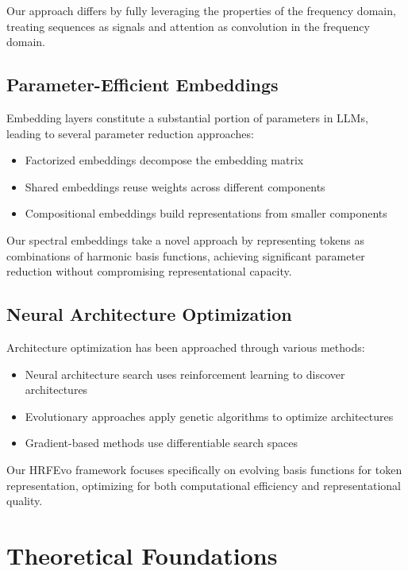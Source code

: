 \documentclass[10pt,twocolumn,letterpaper]{article}
\begin{document}
Our approach differs by fully leveraging the properties of the frequency domain, treating sequences as signals and attention as convolution in the frequency domain.

\subsection{Parameter-Efficient Embeddings}

Embedding layers constitute a substantial portion of parameters in LLMs, leading to several parameter reduction approaches:

\begin{itemize}
    \item Factorized embeddings \cite{lan2019albert} decompose the embedding matrix
    \item Shared embeddings \cite{press2017using} reuse weights across different components
    \item Compositional embeddings \cite{shu2017compressing} build representations from smaller components
\end{itemize}

Our spectral embeddings take a novel approach by representing tokens as combinations of harmonic basis functions, achieving significant parameter reduction without compromising representational capacity.

\subsection{Neural Architecture Optimization}

Architecture optimization has been approached through various methods:

\begin{itemize}
    \item Neural architecture search \cite{zoph2017neural} uses reinforcement learning to discover architectures
    \item Evolutionary approaches \cite{real2019regularized} apply genetic algorithms to optimize architectures
    \item Gradient-based methods \cite{liu2019darts} use differentiable search spaces
\end{itemize}

Our HRFEvo framework focuses specifically on evolving basis functions for token representation, optimizing for both computational efficiency and representational quality.

\section{Theoretical Foundations}
\end{document}
